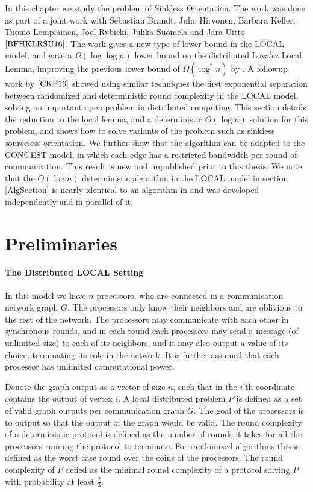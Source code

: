 In this chapter we study the problem of Sinkless Orientation. The work was done as part of a joint work with Sebastian Brandt, Juho Hirvonen, Barbara Keller, Tuomo Lempi{\"{a}}inen, Joel Rybicki, Jukka Suomela and Jara Uitto $\cite{BFHKLRSU16}$. The work gives a new type of lower bound in the LOCAL model, and gave a $\Omega(\log\log n)$ lower bound on the distributed Lova'sz Local Lemma, improving the previous lower bound of $\Omega(\log^*n)$ by \cite{KMPHH14}. A followup work by  $\cite{CKP16}$ showed using similar techniques the first exponential separation between randomized and deterministic round complexity in the LOCAL model, solving an important open problem in distributed computing. This section details the reduction to the local lemma, and a deterministic $O(\log n)$ solution for this problem, and shows how to solve variants of the problem such as sinkless sourceless orientation.  We further show that the algorithm can be adapted to the CONGEST model, in which each edge has a restricted bandwidth per round of communication. This result is new and unpublished prior to this thesis. We note that the $O(\log n)$ deterministic algorithm in the LOCAL model in section \ref{AlgSection} is nearly identical to an algorithm in \cite{GS2017} and was developed independently and in parallel of it.

\section{Preliminaries}

\paragraph{The Distributed LOCAL Setting}
In this model we have $n$ processors, who are connected in a communication network graph $G$. The processors only know their neighbors and are oblivious to the rest of the network. The processors may communicate with each other in synchronous rounds, and in each round each processors may send a message (of unlimited size) to each of its neighbors, and it may also output a value of its choice, terminating its role in the network. It is further assumed that each processor has unlimited computational power. 

Denote the graph output as a vector of size $n$,  such that in the $i$'th coordinate contains the output of vertex $i$. A local distributed problem $P$ is defined as a set of valid graph outputs per communication graph $G$. The goal of the processors is to output so that the output of the graph would be valid. The round complexity of a deterministic protocol is defined as the number of rounds it takes for all the processors running the protocol to terminate. For randomized algorithms this is defined as the worst case round over the coins of the processors. The round complexity of $P$ defied as the minimal round complexity of a protocol solving $P$ with probability at least $\frac{2}{3}$.

